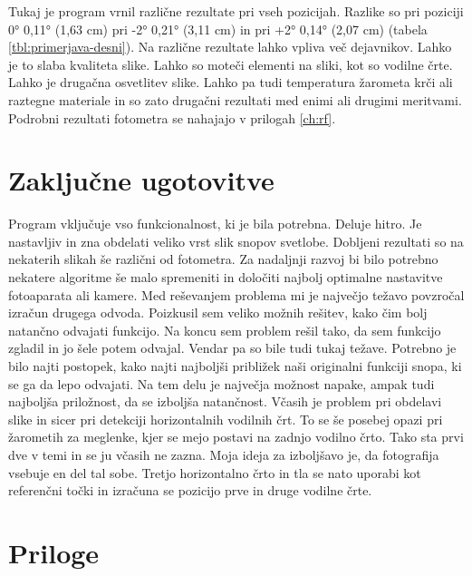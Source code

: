 \documentclass[oneside, a4paper, 12pt]{book}
\begin{document}
Tukaj je program vrnil različne rezultate pri vseh pozicijah. Razlike so pri poziciji 0° 0,11° (1,63 cm) pri -2° 0,21° (3,11 cm) in pri +2° 0,14° (2,07 cm) (tabela \ref{tbl:primerjava-desni}). Na različne rezultate lahko vpliva več dejavnikov. Lahko je to slaba kvaliteta slike. Lahko so moteči elementi na sliki, kot so vodilne črte. Lahko je drugačna osvetlitev slike. Lahko pa tudi temperatura žarometa krči ali raztegne materiale in so zato drugačni rezultati med enimi ali drugimi meritvami. Podrobni rezultati fotometra se nahajajo v prilogah \ref{ch:rf}.

\chapter{Zaključne ugotovitve}
\label{ch:zakljucek}
Program vključuje vso funkcionalnost, ki je bila potrebna. Deluje hitro. Je nastavljiv in zna obdelati veliko vrst slik snopov svetlobe. Dobljeni rezultati so na nekaterih slikah še različni od fotometra. Za nadaljnji razvoj bi bilo potrebno nekatere algoritme še malo spremeniti in določiti najbolj optimalne nastavitve fotoaparata ali kamere. Med reševanjem problema mi je največjo težavo povzročal izračun drugega odvoda. Poizkusil sem veliko možnih rešitev, kako čim bolj natančno odvajati funkcijo. Na koncu sem problem rešil tako, da sem funkcijo zgladil in jo šele potem odvajal. Vendar pa so bile tudi tukaj težave. Potrebno je bilo najti postopek, kako najti najboljši približek naši originalni funkciji snopa, ki se ga da lepo odvajati. Na tem delu je največja možnost napake, ampak tudi najboljša priložnost, da se izboljša natančnost. Včasih je problem pri obdelavi slike in sicer pri detekciji horizontalnih vodilnih črt. To se še posebej opazi pri žarometih za meglenke, kjer se mejo postavi na zadnjo vodilno črto. Tako sta prvi dve v temi in se ju včasih ne zazna. Moja ideja za izboljšavo je, da fotografija vsebuje en del tal sobe. Tretjo horizontalno črto in tla se nato uporabi kot referenčni točki in izračuna se pozicijo prve in druge vodilne črte.

\chapter{Priloge}
\end{document}
